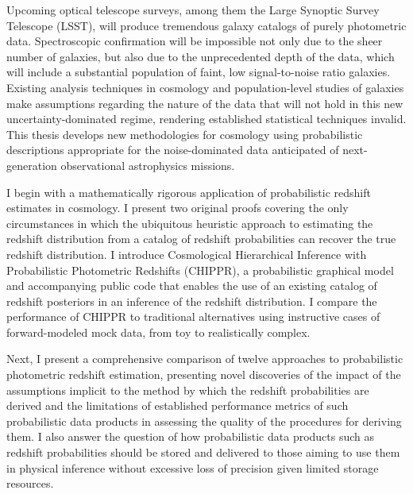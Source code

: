Upcoming optical telescope surveys, among them the Large Synoptic Survey Telescope (LSST), will produce tremendous galaxy catalogs of purely photometric data.
Spectroscopic confirmation will be impossible not only due to the sheer number of galaxies, but also due to the unprecedented depth of the data, which will include a substantial population of faint, low signal-to-noise ratio galaxies.
Existing analysis techniques in cosmology and population-level studies of galaxies make assumptions regarding the nature of the data that will not hold in this new uncertainty-dominated regime, rendering established statistical techniques invalid.
This thesis develops new methodologies for cosmology using probabilistic descriptions appropriate for the noise-dominated data anticipated of next-generation observational astrophysics missions. 

I begin with a mathematically rigorous application of probabilistic redshift estimates in cosmology.
I present two original proofs covering the only circumstances in which the ubiquitous heuristic approach to estimating the redshift distribution from a catalog of redshift probabilities can recover the true redshift distribution.
I introduce Cosmological Hierarchical Inference with Probabilistic Photometric Redshifts (CHIPPR), a probabilistic graphical model and accompanying public code that enables the use of an existing catalog of redshift posteriors in an inference of the redshift distribution.
I compare the performance of CHIPPR to traditional alternatives using instructive cases of forward-modeled mock data, from toy to realistically complex.

Next, I present a comprehensive comparison of twelve approaches to probabilistic photometric redshift estimation, presenting novel discoveries of the impact of the assumptions implicit to the method by which the redshift probabilities are derived and the limitations of established performance metrics of such probabilistic data products in assessing the quality of the procedures for deriving them.
I also answer the question of how probabilistic data products such as redshift probabilities should be stored and delivered to those aiming to use them in physical inference without excessive loss of precision given limited storage resources.

